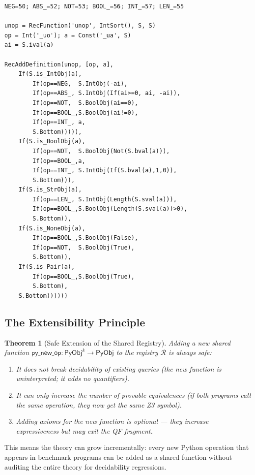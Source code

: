 \documentclass[11pt,a4paper]{report}
\theoremstyle{definition}
\theoremstyle{plain}
\newtheorem{theorem}[definition]{Theorem}
\newcommand{\PyObj}{\mathsf{PyObj}}
\begin{document}
\begin{lstlisting}[caption={unop: complete Z3 implementation}]
NEG=50; ABS_=52; NOT=53; BOOL_=56; INT_=57; LEN_=55

unop = RecFunction('unop', IntSort(), S, S)
op = Int('_uo'); a = Const('_ua', S)
ai = S.ival(a)

RecAddDefinition(unop, [op, a],
    If(S.is_IntObj(a),
        If(op==NEG,  S.IntObj(-ai),
        If(op==ABS_, S.IntObj(If(ai>=0, ai, -ai)),
        If(op==NOT,  S.BoolObj(ai==0),
        If(op==BOOL_,S.BoolObj(ai!=0),
        If(op==INT_, a,
        S.Bottom))))),
    If(S.is_BoolObj(a),
        If(op==NOT,  S.BoolObj(Not(S.bval(a))),
        If(op==BOOL_,a,
        If(op==INT_, S.IntObj(If(S.bval(a),1,0)),
        S.Bottom))),
    If(S.is_StrObj(a),
        If(op==LEN_, S.IntObj(Length(S.sval(a))),
        If(op==BOOL_,S.BoolObj(Length(S.sval(a))>0),
        S.Bottom)),
    If(S.is_NoneObj(a),
        If(op==BOOL_,S.BoolObj(False),
        If(op==NOT,  S.BoolObj(True),
        S.Bottom)),
    If(S.is_Pair(a),
        If(op==BOOL_,S.BoolObj(True),
        S.Bottom),
    S.Bottom))))))
\end{lstlisting}

\subsection{The Extensibility Principle}

\begin{theorem}[Safe Extension of the Shared Registry]
\label{thm:safe-extension}
Adding a new shared function $\mathsf{py\_new\_op} : \PyObj^k \to
\PyObj$ to the registry $\mathcal{R}$ is \emph{always safe}:
\begin{enumerate}
  \item It does not break decidability of existing queries (the new
    function is uninterpreted; it adds no quantifiers).
  \item It can only \emph{increase} the number of provable
    equivalences (if both programs call the same operation, they
    now get the same Z3 symbol).
  \item Adding axioms for the new function is \emph{optional} ---
    they increase expressiveness but may exit the QF fragment.
\end{enumerate}
\end{theorem}

This means the theory can grow incrementally: every new Python
operation that appears in benchmark programs can be added as a shared
function without auditing the entire theory for decidability regressions.
\end{document}

